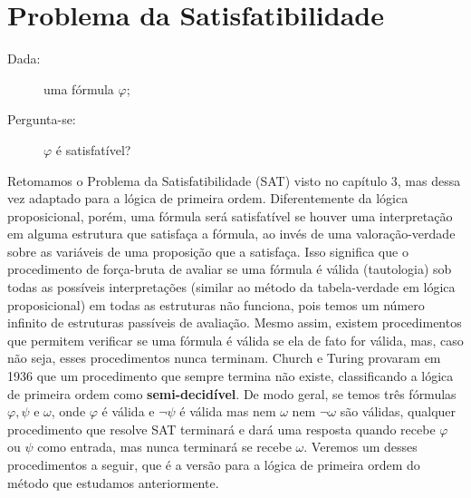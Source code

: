 \chapter{Problema da Satisfatibilidade}

\begin{description}
    \item[Dada:] uma fórmula $\varphi$;
    \item[Pergunta-se:] $\varphi$ é satisfatível? 
\end{description}

Retomamos o Problema da Satisfatibilidade (SAT) visto no capítulo 3, mas dessa vez adaptado para a lógica de primeira ordem. Diferentemente da lógica proposicional, porém, uma fórmula será satisfatível se houver uma interpretação em alguma estrutura que satisfaça a fórmula, ao invés de uma valoração-verdade sobre as variáveis de uma proposição que a satisfaça. Isso significa que o procedimento de força-bruta de avaliar se uma fórmula é válida (tautologia) sob todas as possíveis interpretações (similar ao método da tabela-verdade em lógica proposicional) em todas as estruturas não funciona, pois temos um número infinito de estruturas passíveis de avaliação. Mesmo assim, existem procedimentos que permitem verificar se uma fórmula é válida se ela de fato for válida, mas, caso não seja, esses procedimentos nunca terminam. Church e Turing provaram em 1936 que um procedimento que sempre termina não existe, classificando a lógica de primeira ordem como \textbf{semi-decidível}. De modo geral, se temos três fórmulas $\varphi, \psi$ e $\omega$, onde $\varphi$ é válida e $\neg \psi$ é válida mas nem $\omega$ nem $\neg \omega$ são válidas, qualquer procedimento que resolve SAT terminará e dará uma resposta quando recebe $\varphi$ ou $\psi$ como entrada, mas nunca terminará se recebe $\omega$. Veremos um desses procedimentos a seguir, que é a versão para a lógica de primeira ordem do método que estudamos anteriormente. 

